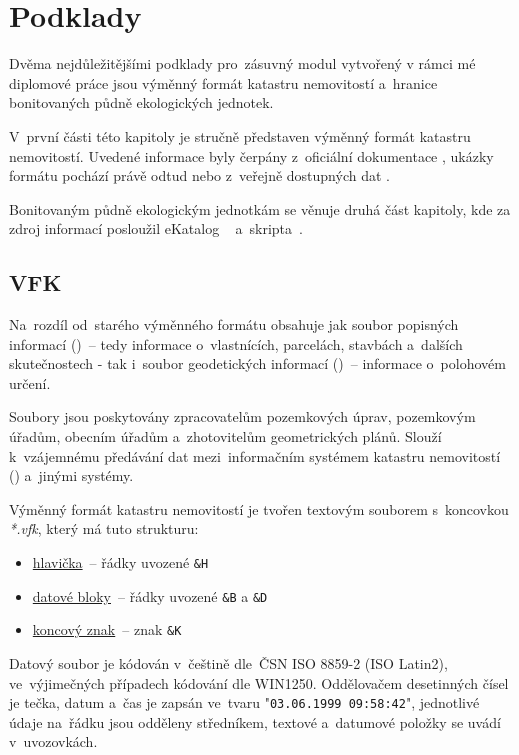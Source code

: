 \chapter{Podklady}
\label{podklady}

Dvěma nejdůležitějšími podklady pro~zásuvný modul vytvořený v rámci mé diplomové práce jsou výměnný formát katastru nemovitostí a~hranice bonitovaných půdně ekologických jednotek.

V~první části této kapitoly je stručně představen výměnný formát katastru nemo\-vitostí. Uvedené informace byly čerpány z~oficiální dokumentace \citep{struktura_vfk}, ukázky formátu pochází právě odtud nebo z~veřejně dostupných dat \citep{zdroj_vfk}.

Bonitovaným půdně ekologickým jednotkám se věnuje druhá část kapitoly, kde za zdroj informací posloužil eKatalog ~\citep{vumop_bpej} a~skripta~\citep{pu_skripta}.

\section{VFK}
\label{vfk}

Na~rozdíl od~starého výměnného formátu obsahuje  jak soubor popisných informací ()~– tedy informace o~vlastnících, parcelách, stavbách a~dalších skutečnostech - tak i~soubor geodetických informací ()~– informace o~polohovém určení.

Soubory  jsou poskytovány zpracovatelům pozemkových úprav, pozemko\-vým úřadům, obecním úřadům a~zhotovitelům geometrických plánů. Slouží k~vzájemnému předávání dat mezi~informačním systémem katastru nemovitostí () a~jiný\-mi systémy.

Výměnný formát katastru nemovitostí je tvořen textovým souborem s~koncovkou \textit{*.vfk}, který má tuto strukturu:
	\begin{itemize}[leftmargin=1.5cm, noitemsep]
		\item \underline{hlavička}~– řádky uvozené \texttt{\&H}
		\item \underline{datové bloky}~– řádky uvozené \texttt{\&B} a \texttt{\&D}
		\item \underline{koncový znak}~– znak \texttt{\&K}
	\end{itemize}

Datový soubor je kódován v~češtině dle~ČSN ISO 8859-2 (ISO Latin2), ve~výjimeč\-ných případech kódování dle
WIN1250. Oddělovačem desetinných čísel je tečka, datum a~čas je zapsán ve~tvaru "\texttt{03.06.1999 09:58:42}", jednotlivé údaje na~řádku jsou odděleny středníkem, textové a~datumové položky se uvádí v~uvozovkách.

